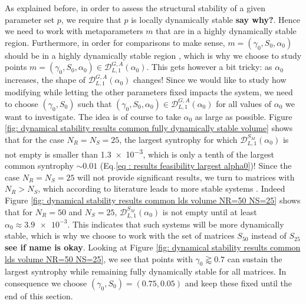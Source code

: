 \documentclass[12pt, titlepage]{report}
\begin{document}
As explained before, in order to assess the structural stability of a given parameter set $p$, we require that $p$ is locally dynamically stable \textbf{say why?}. Hence we need to work with metaparameters $m$ that are in a highly dynamically stable region. Furthermore, in order for comparisons to make sense, $m=(\gamma_0, S_0, \alpha_0)$ should be in a highly dynamically stable region , which is why we choose to study points $m=(\gamma_0, S_0, \alpha_0) \in \mathcal{D}_{L,1}^{G,A}(\alpha_0)$. This gets however a bit tricky: as $\alpha_0$ increases, the shape of $\mathcal{D}_{L,1}^{G,A}(\alpha_0)$ changes! Since we would like to study how modifying  while letting the other parameters fixed impacts the system, we need to choose $(\gamma_0, S_0)$ such that
$(\gamma_0, S_0, \alpha_0) \in \mathcal{D}_{L,1}^{G,A}(\alpha_0)$ for all values of $\alpha_0$ we want to investigate. The idea is of course to take $\alpha_0$ as large as possible. Figure \ref{fig: dynamical stability results common fully dynamically stable volume} shows that for the case $N_R=N_S=25$, the largest syntrophy for which $\mathcal{D}_{L,1}^{S_M}(\alpha_0)$ is not empty is smaller than \num{1.3e-3}, which is only a tenth of the largest common syntrophy $\sim 0.01$ (Eq.\ref{eq : results feasibility largest alpha0})! Since the case $N_R=N_S=25$  will not provide significant results, we turn to matrices with $N_R > N_S$, which according to literature leads to more stable systems \cite{biroli_marginally_2018}. Indeed Figure \ref{fig: dynamical stability results common lds volume NR=50 NS=25} shows that for $N_R=50$ and $N_S=25$, $\mathcal{D}_{L,1}^{S_M}(\alpha_0)$ is not empty until at least $\alpha_0 \approx \num{3.9e-3}$. This indicates that such systems will be more dynamically stable, which is why we choose to work with the set of matrices $S_{50}$ instead of $S_{25}$ \textbf{see if name is okay}. Looking at Figure \ref{fig: dynamical stability results common lds volume NR=50 NS=25}, we see that points with $\gamma_0 \gtrapprox 0.7$ can sustain the largest syntrophy while remaining fully dynamically stable for all matrices. In consequence we choose $(\gamma_0, S_0)=(0.75, 0.05)$ and keep these fixed until the end of this section.
\end{document}
